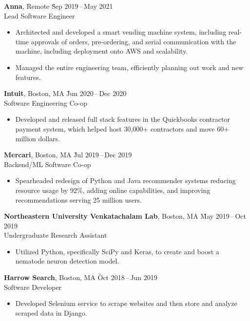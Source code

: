 \documentclass[11pt]{article}
\begin{document}
\begin{samepage}
\begin{tabbing}
  \textbf{Anna}, Remote \` Sep 2019\,--\,May 2021 \\
  Lead Software Engineer
\end{tabbing}
\begin{itemize}
  \item Architected and developed a smart vending machine system, including 
  real-time approvals of orders, pre-ordering, and serial communication 
  with the machine, including deployment onto AWS and scalability.
  \item Managed the entire engineering team, efficiently 
  planning out work and new features.
\end{itemize}

\begin{tabbing}
  \textbf{Intuit}, Boston, MA \` Jun 2020\,--\,Dec 2020 \\
  Software Engineering Co-op
\end{tabbing}
\begin{itemize}
  \item{Developed and released full stack features in the Quickbooks contractor payment system, 
  which helped host 30,000+ contractors and move 60+ million dollars.}
\end{itemize}

\begin{tabbing}
  \textbf{Mercari}, Boston, MA \` Jul 2019\,--\,Dec 2019 \\
  Backend/ML Software Co-op
\end{tabbing}
\begin{itemize}
  \item Spearheaded redesign of Python and Java recommender systems reducing resource usage by 92\%, adding online capabilities, and improving recommendations serving 25 million users.
\end{itemize}

\begin{tabbing}
  \textbf{Northeastern University Venkatachalam Lab}, Boston, MA \` May 2019\,--\,Oct 2019 \\
  Undergraduate Research Assistant
\end{tabbing}
\begin{itemize}
  \item Utilized Python, specifically SciPy and Keras, to create and boost a nematode neuron detection model.
\end{itemize}

\begin{tabbing}
  \textbf{Harrow Search}, Boston, MA \` Oct 2018\,--\,Jun 2019 \\
  Software Developer
\end{tabbing}
\begin{itemize}
  \item Developed Selenium service to scrape websites and then store and analyze scraped data in Django.
\end{itemize}


\end{samepage}
\end{document}
